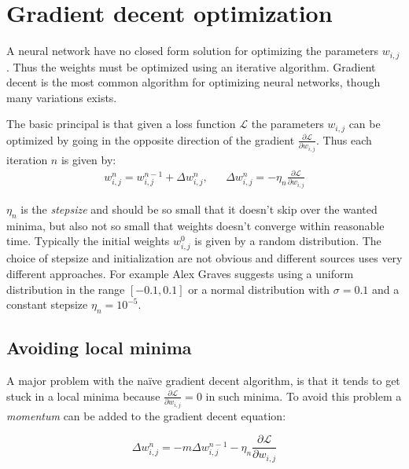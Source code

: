 \section{Gradient decent optimization}

A neural network have no closed form solution for optimizing the parameters $w_{i,j}$. Thus the weights must be optimized using an iterative algorithm. Gradient decent is the most common algorithm for optimizing neural networks, though many variations exists.

The basic principal is that given a loss function $\mathcal{L}$ the parameters $w_{i,j}$ can be optimized by going in the opposite direction of the gradient $\frac{\partial \mathcal{L}}{\partial w_{i,j}}$. Thus each iteration $n$ is given by:
\begin{equation}
\begin{aligned}
w_{i,j}^n = w_{i,j}^{n-1} + \Delta w_{i,j}^n, && \Delta w_{i,j}^n = - \eta_n \frac{\partial \mathcal{L}}{\partial w_{i,j}}
\end{aligned}
\end{equation}

$\eta_n$ is the \textit{stepsize} and should be so small that it doesn't skip over the wanted minima, but also not so small that weights doesn't converge within reasonable time. Typically the initial weights $w^0_{i,j}$ is given by a random distribution. The choice of stepsize and initialization are not obvious and different sources uses very different approaches. For example Alex Graves \cite{alexgraves} suggests using a uniform distribution in the range $[-0.1, 0.1]$ or a normal distribution with $\sigma = 0.1$ and a constant stepsize $\eta_n = 10^{-5}$.

\subsection{Avoiding local minima}

A major problem with the naïve gradient decent algorithm, is that it tends to get stuck in a local minima because $\frac{\partial \mathcal{L}}{\partial w_{i,j}} = 0$ in such minima. To avoid this problem a \textit{momentum} can be added to the gradient decent equation:

\begin{equation}
\Delta w_{i,j}^n = - m \Delta w_{i,j}^{n-1} - \eta_n \frac{\partial \mathcal{L}}{\partial w_{i,j}}
\end{equation}

